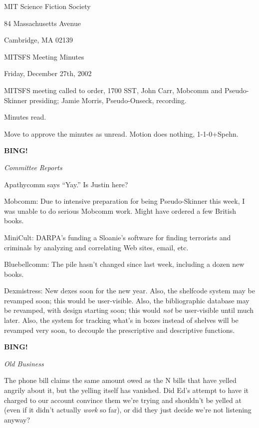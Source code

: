 \documentclass[12pt]{article}
\newcommand{\bing}{{\bf BING!} }
\newcommand{\goto}[1]{\bing \vskip 12pt \centerline{{\em{#1}}}}
\begin{document}
\begin{center}

MIT Science Fiction Society 

84 Massachusetts Avenue

Cambridge, MA 02139

\vspace{12pt}

MITSFS Meeting Minutes 

Friday, December 27th, 2002

\end{center}
 
\vspace{18pt}

\setlength{\parskip}{6pt}

\noindent
MITSFS meeting called to order, 1700 SST, John Carr, Mobcomm and Pseudo-Skinner
presiding; Jamie Morris, Pseudo-Onseck, recording.

Minutes read.

Move to approve the minutes as unread.
Motion does nothing, 1-1-0+Spehn.

\goto{Committee Reports}

Apathycomm says ``Yay.''  Is Justin here?

Mobcomm: Due to intensive preparation for being Pseudo-Skinner this week,
I was unable to do serious Mobcomm work.  Might have ordered a few British
books.

MiniCult: DARPA's funding a Sloanie's software for finding terrorists
and criminals by analyzing and correlating Web sites, email, etc.

Bluebellcomm: The pile hasn't changed since last week, including a dozen
new books.

Dexmistress: New dexes soon for the new year.  Also, the shelfcode system
may be revamped soon; this would be user-visible.  Also, the bibliographic
database may be revamped, with design starting soon; this would \emph{not}
be user-visible until much later.  Also, the system for tracking what's
in boxes instead of shelves will be revamped very soon, to decouple the
prescriptive and descriptive functions.

\goto{Old Business}

The phone bill claims the same amount owed as the N bills that have yelled
angrily about it, but the yelling itself has vanished.  Did Ed's attempt to
have it charged to our account convince them we're trying and shouldn't be
yelled at (even if it didn't actually \emph{work} so far), or did they just
decide we're not listening anyway?
\end{document}
